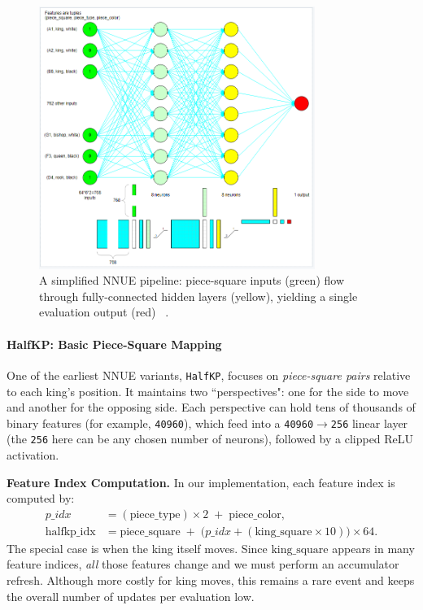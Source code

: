 \documentclass[12pt,a4paper]{article}
\begin{document}
\begin{figure}[H]
    \centering
    \includegraphics[width=0.8\textwidth]{figures/pipeline.png}
    \caption{A simplified NNUE pipeline: piece-square inputs (green) flow through 
    fully-connected hidden layers (yellow), yielding a single evaluation output (red) ~\cite{githubdocs}.}
    \label{fig:nnue_pipeline}
\end{figure}

\paragraph{HalfKP: Basic Piece-Square Mapping}
\label{sec:halfkp}

One of the earliest NNUE variants, \texttt{HalfKP}, focuses on \emph{piece-square
pairs} relative to each king’s position. It maintains two “perspectives": one for the side to move and another for the opposing side.
Each perspective can hold tens of thousands of binary features (for example,
\texttt{40960}), which feed into a \texttt{40960$\to$256} linear layer (the
\texttt{256} here can be any chosen number of neurons), followed by a clipped
ReLU activation.\medskip

\noindent
\textbf{Feature Index Computation.} In our implementation, each feature index is computed by:
\[
\begin{aligned}
p\_idx &= (\text{piece\_type}) \times 2 \;+\; \text{piece\_color},\\
\text{halfkp\_idx} &= \text{piece\_square} 
    \;+\;
    \bigl(p\_idx + (\text{king\_square} \times 10)\bigr)\times 64.
\end{aligned}
\]
The special case is when the king itself moves. Since \(\text{king\_square}\) appears in many feature indices, \emph{all} those features change and we must perform an accumulator refresh. Although more costly for king moves, this remains a rare event and keeps the overall number of updates per evaluation low.
\end{document}
